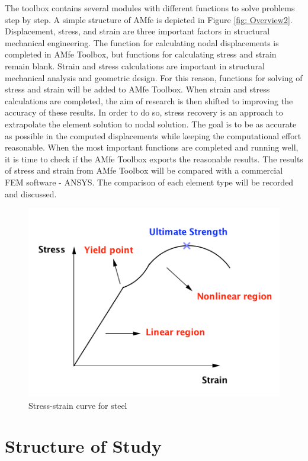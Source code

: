 The toolbox contains several modules with different functions to solve problems step by step. A simple structure of AMfe is depicted in Figure \ref{fig: Overview2}. Displacement, stress, and strain are three important factors in structural mechanical engineering. The function for calculating nodal displacements is completed in AMfe Toolbox, but functions for calculating stress and strain remain blank. Strain and stress calculations are important in structural mechanical analysis and geometric design. For this reason, functions for solving of stress and strain will be added to AMfe Toolbox. When strain and stress calculations are completed, the aim of research is then shifted to improving the accuracy of these results. In order to do so, stress recovery is an approach to extrapolate the element solution to nodal solution. The goal is to be as accurate as possible in the computed displacements while keeping the computational effort reasonable. When the most important functions are completed and running well, it is time to check if the AMfe Toolbox exports the reasonable results. The results of stress and strain from AMfe Toolbox will be compared with a commercial FEM software - ANSYS. The comparison of each element type will be recorded and discussed. 

\begin{figure}
	\begin{center}
		\includegraphics[width=12cm,clip]{nonlinear.pdf}			
		\caption{Stress-strain curve for steel} \label{fig: nonlinear}
	\end{center}
\end{figure}

\section{Structure of Study}

